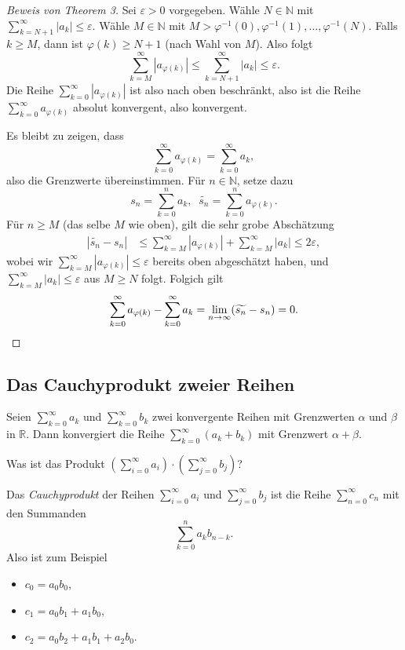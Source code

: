 \documentclass[../main.tex]{subfiles}
\begin{document}
\begin{proof}[Beweis von Theorem 3]
  Sei $\varepsilon > 0$ 
  vorgegeben.
  Wähle $N \in \mathbb{N}$ 
  mit $\sum_{k=N+1}^{\infty} |a_k| \leq \varepsilon$.
  Wähle $M \in \mathbb{N}$ mit $M > \varphi^{-1}(0),
  \varphi^{-1}(1), \dots, \varphi^{-1}(N)$.
  Falls $k \geq M$, dann ist $\varphi(k) \geq N+1$
  (nach Wahl von $M$).
  Also folgt
  \[
   \sum_{k=M}^{\infty} |a_{\varphi(k)}| 
   \leq \sum_{k=N+1}^{\infty} |a_k| \leq \varepsilon.
  \]
  Die Reihe
  $\sum_{k=0}^{\infty} |a_{\varphi(k)}|$ ist also
  nach oben beschränkt,
  also ist die Reihe
  $\sum_{k=0}^{\infty} a_{\varphi(k)}$ absolut konvergent,
  also konvergent.

  Es bleibt zu zeigen, dass
  \[
    \sum_{k=0}^{\infty} a_{\varphi(k)} = \sum_{k=0}^{\infty} a_k,
  \]
  also die Grenzwerte übereinstimmen.
  Für $n \in \mathbb{N}$, setze dazu
  \[
    s_n = \sum_{k=0}^{n} a_k, \;\; \widetilde{s_n} =
    \sum_{k=0}^{n} a_{\varphi(k)}.
  \]
  Für $n \geq M$ (das selbe $M$ wie oben),
  gilt die sehr grobe Abschätzung
  \begin{align*}
    |\widetilde{s_n} - s_n| & \leq
    \sum_{k=M}^{\infty} |a_{\varphi(k)}|
    + \sum_{k=M}^{\infty} |a_k| \leq 2\varepsilon,
  \end{align*}
  wobei wir
  $\sum_{k=M}^{\infty} |a_{\varphi(k)}| \leq \varepsilon$ 
  bereits oben abgeschätzt haben,
  und $\sum_{k=M}^{\infty} |a_k| \leq \varepsilon$ aus
  $M \geq N$ folgt.
  Folgich gilt
  \[
    \sum_{k=0}^{\infty} a_{\varphi(k)}
    - \sum_{k=0}^{\infty} a_{k} =
    \lim_{n \to \infty}(\widetilde{s_n} - s_n) = 0. \qedhere
  \]
\end{proof}

\subsection*{Das Cauchyprodukt zweier Reihen}
Seien $\sum_{k=0}^{\infty} a_k$ und $\sum_{k=0}^{\infty} b_k$ 
zwei konvergente Reihen mit Grenzwerten
$\alpha$ und $\beta$ in $\mathbb{R}$.
Dann konvergiert die Reihe
$\sum_{k=0}^{\infty} (a_k + b_k)$ mit Grenzwert
$\alpha + \beta$.

\begin{question}
  Was ist das Produkt $\left( \sum_{i=0}^{\infty} a_i \right)
  \cdot \left( \sum_{j=0}^{\infty} b_j \right)$?
\end{question}

\begin{definition}
  Das \emph{Cauchyprodukt} der Reihen
  $\sum_{i=0}^{\infty} a_i$ und $\sum_{j=0}^{\infty} b_j$ 
  ist die Reihe $\sum_{n=0}^{\infty} c_n$ mit den Summanden
  \[
    \sum_{k=0}^{n} a_k b_{n-k}.
  \]
  Also ist zum Beispiel
  \begin{itemize}
    \item $c_0 = a_0 b_0$,
    \item $c_1 = a_0 b_1 + a_1 b_0$,
    \item $c_2 = a_0 b_2 + a_1 b_1 + a_2 b_0$.
  \end{itemize}
\end{definition}
\end{document}
